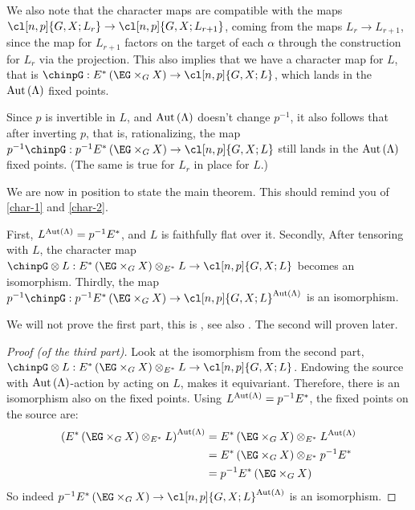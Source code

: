 We also note that the character maps are compatible with the maps $\cl[n,p]{G,X; L_r} \to \cl[n,p]{G,X; L_{r+1}}$, coming from the maps $L_r \to L_{r+1}$, since the map for $L_{r+1}$ factors on the target of each $\alpha$ through the construction for $L_r$ via the projection.
This also implies that we have a character map for $L$, that is $\chinpG: E^*\left(\EG \times_G X\right) \to \cl[n,p]{G,X; L}$, which lands in the $\operatorname{Aut} \left(\Lambda\right)$ fixed points.

Since $p$ is invertible in $L$, and $\operatorname{Aut} \left(\Lambda\right)$ doesn't change $p^{-1}$, it also follows that after inverting $p$, that is, rationalizing, the map $p^{-1} \chinpG: p^{-1} E^*\left(\EG \times_G X\right) \to \cl[n,p]{G,X; L}$ still lands in the $\operatorname{Aut} \left(\Lambda\right)$ fixed points.
(The same is true for $L_r$ in place for $L$.)

We are now in position to state the main theorem.
This should remind you of \ref{char-1} and \ref{char-2}.

\begin{theorem}
	First, $L^{\operatorname{Aut} \left(\Lambda\right)} = p^{-1} E^*$, and $L$ is faithfully flat over it.
	Secondly, After tensoring with $L$, the character map
	$\chinpG \otimes L: E^*\left(\EG \times_G X\right) \otimes_{E^*} L \to \cl[n,p]{G,X; L}$
	becomes an isomorphism.
	Thirdly, the map
	$p^{-1}\chinpG: p^{-1} E^*\left(\EG \times_G X\right) \to \cl[n,p]{G,X; L}^{\aut \left(\Lambda\right)}$
	is an isomorphism.
\end{theorem}

We will not prove the first part, this is \cite[6.8]{HKR}, see also \cite[6.5]{HKR}.
The second will proven later.

\begin{proof}[Proof (of the third part)]
	Look at the isomorphism from the second part,
	$\chinpG \otimes L: E^*\left(\EG \times_G X\right) \otimes_{E^*} L \to \cl[n,p]{G,X; L}$.
	Endowing the source with $\operatorname{Aut} \left(\Lambda\right)$-action by acting on $L$, makes it equivariant.
	Therefore, there is an isomorphism also on the fixed points.
	Using $L^{\operatorname{Aut} \left(\Lambda\right)} = p^{-1} E^*$, the fixed points on the source are:
	\begin{align*}
		\left(E^*\left(\EG \times_G X\right) \otimes_{E^*} L\right)^{\aut \left(\Lambda\right)}
		&= E^*\left(\EG \times_G X\right) \otimes_{E^*} L^{\aut \left(\Lambda\right)}\\
		&= E^*\left(\EG \times_G X\right) \otimes_{E^*} p^{-1} E^*\\
		&= p^{-1} E^*\left(\EG \times_G X\right)
	\end{align*}
	So indeed $p^{-1} E^*\left(\EG \times_G X\right) \to \cl[n,p]{G,X; L}^{\aut \left(\Lambda\right)}$ is an isomorphism.
\end{proof}
